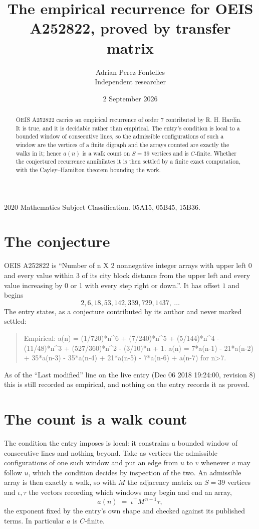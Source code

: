 \documentclass[11pt,a4paper]{article}
\title{The empirical recurrence for OEIS A252822, proved by transfer matrix}
\author{Adrian Perez Fontelles\\ \small Independent researcher}
\date{2 September 2026}
\theoremstyle{plain}
\theoremstyle{definition}
\begin{document}
\maketitle

\begin{abstract}
OEIS A252822 carries an empirical recurrence of order $7$ contributed by R. H. Hardin. It is
true, and it is decidable rather than empirical. The entry's condition is local to a bounded window of consecutive lines, so
the admissible configurations of such a window are the vertices of a finite digraph and the
arrays counted are exactly the walks in it; hence $a(n)$ is a walk count on $S=39$ vertices
and is $C$-finite. Whether the conjectured recurrence annihilates it is then settled by a
finite exact computation, with the Cayley--Hamilton theorem bounding the work.
\end{abstract}

\noindent\small 2020 Mathematics Subject Classification. 05A15, 05B45, 15B36.\normalsize

\section{The conjecture}

OEIS A252822 is ``Number of n X 2 nonnegative integer arrays with upper left 0 and every value within 3 of its city block distance from the upper left and every value increasing by 0 or 1 with every step right or down.''. It has offset $1$ and begins
\[
2, 6, 18, 53, 142, 339, 729, 1437,\ \dots
\]
The entry states, as a conjecture contributed by its author and never marked settled:
\begin{quote}
Empirical: a(n) = (1/720)*n\^{}6 + (7/240)*n\^{}5 + (5/144)*n\^{}4 - (11/48)*n\^{}3 + (527/360)*n\^{}2 - (3/10)*n + 1. a(n) = 7*a(n-1) - 21*a(n-2) + 35*a(n-3) - 35*a(n-4) + 21*a(n-5) - 7*a(n-6) + a(n-7) for n>7.
\end{quote}
As of the ``Last modified'' line on the live entry (Dec 06 2018 19:24:00, revision 8) this is still
recorded as empirical, and nothing on the entry records it as proved.

\section{The count is a walk count}

The condition the entry imposes is local: it constrains a bounded window of consecutive lines and nothing beyond. Take as
vertices the admissible configurations of one such window and put an edge from $u$ to $v$
whenever $v$ may follow $u$, which the condition decides by inspection of the two. An
admissible array is then exactly a walk, so with $M$ the adjacency matrix on $S=39$ vertices
and $\iota,\tau$ the vectors recording which windows may begin and end an array,
\[
a(n)\;=\;\iota^{\!\top}M^{\,n-1}\tau ,
\]
the exponent fixed by the entry's own shape and checked against its published terms. In
particular $a$ is $C$-finite.
\end{document}
